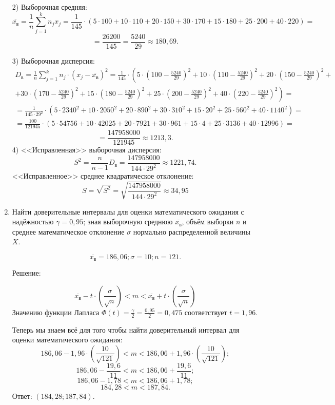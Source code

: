 \documentclass{article}
\begin{document}
\begin{enumerate}
2) Выборочная средняя:
$$\overline{x_\textit{в}}=\frac{1}{n}\sum_{j=1}^k n_j x_j=\frac{1}{145}\cdot\left(5\cdot100+10\cdot110+20\cdot150+30\cdot170+15\cdot180+25\cdot200+40\cdot220\right)=$$
$$=\frac{26200}{145}=\frac{5240}{29}\approx180,69.$$

3) Выборочная дисперсия:
\begin{multline*}
D_{\textit{в}}=\frac{1}{n}\sum_{j=1}^k n_j
\cdot\left(x_j-\overline{x_\textit{в}}\right)^2=
\frac{1}{145}\cdot\left(5\cdot\left(100-\frac{5240}{29}\right)^2+10\cdot\left(110-\frac{5240}{29}\right)^2+20\cdot\left(150-\frac{5240}{29}\right)^2+\right.\\
+\left.30\cdot\left(170-\frac{5240}{29}\right)^2+15\cdot\left(180-\frac{5240}{29}\right)^2+25\cdot\left(200-\frac{5240}{29}\right)^2+40\cdot\left(220-\frac{5240}{29}\right)^2\right)=\\
=\frac{1}{145\cdot29^2}\cdot\left(5\cdot2340^2+10\cdot2050^2+20\cdot890^2+30\cdot310^2+15\cdot20^2+25\cdot560^2+40\cdot1140^2\right)=\\
=\frac{100}{121945}\cdot\left(5\cdot54756+10\cdot42025+20\cdot7921+30\cdot961+15\cdot4+25\cdot3136+40\cdot12996\right)=
\end{multline*}
$$=\frac{147958000}{121945}\approx1213,3.$$
4) <<Исправленная>> выборочная дисперсия:
$$S^2=\frac{n}{n-1}D_{\textit{в}}=\frac{147958000}{144\cdot29^2}\approx1221,74.$$
<<Исправленное>> среднее квадратическое отклонение:
$$S=\sqrt{S^2}=\sqrt{\frac{147958000}{144\cdot29^2}}\approx34,95$$

\item %
Найти доверительные интервалы для оценки математического ожидания с надёжностью $\gamma=0,95$; зная выборочную среднюю $\overline{x_\textit{в}}$, объём выборки $n$ и среднее математическое отклонение $\sigma$ нормально распределенной величины $X$.

$$\overline{x_\textit{в}}=186,06; \sigma=10; n=121.$$
\begin{center}Решение:\end{center}
$$\overline{x_\textit{в}}-t\cdot\left(\frac{\sigma}{\sqrt{n}}\right)<m<\overline{x_\textit{в}}+t\cdot\left(\frac{\sigma}{\sqrt{n}}\right)$$
Значению функции Лапласа $\Phi(t)=\frac{\gamma}{2}=\frac{0,95}{2}=0,475$ соответствует $t=1,96$.

Теперь мы знаем всё для того чтобы найти доверительный интервал для оценки математического ожидания:
$$186,06-1,96\cdot\left(\frac{10}{\sqrt{121}}\right)<m<186,06+1,96\cdot\left(\frac{10}{\sqrt{121}}\right);$$
$$186,06-\frac{19,6}{11}<m<186,06+\frac{19,6}{11};$$
$$186,06-1,78<m<186,06+1,78;$$
$$184,28<m<187,84.$$
Ответ: $(184,28;187,84)$.

\end{enumerate}
\end{document}
